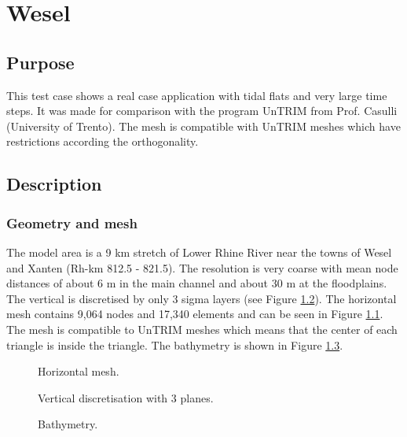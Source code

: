 \chapter{Wesel}

\section{Purpose}
This test case shows a real case application
with tidal flats and very large time steps.
It was made for comparison with the program UnTRIM
from Prof. Casulli (University of Trento).
The mesh is compatible with UnTRIM meshes which have restrictions according the
orthogonality.

\section{Description}

\subsection{Geometry and mesh}
The model area is a 9 km stretch of Lower Rhine River near the towns of Wesel
and Xanten (Rh-km 812.5 - 821.5).
The resolution is very coarse with mean node distances of about 6 m in the main
channel and about 30 m at the floodplains.
The vertical is discretised by only 3 sigma layers
(see Figure \ref{t3d:Wesel:vertical_grid}).
The horizontal mesh contains 9,064 nodes and 17,340 elements and can be seen in
Figure \ref{t3d:Wesel:mesh}.
The mesh is compatible to UnTRIM meshes which means that the center of each
triangle is inside the triangle.
The bathymetry is shown in Figure \ref{t3d:Wesel:Bathy}.

\begin{figure}[h!]
\centering
{}
\caption{Horizontal mesh.}
\label{t3d:Wesel:mesh}
\end{figure}

\begin{figure}[h!]
\centering
{}
\caption{Vertical discretisation with 3 planes.}
\label{t3d:Wesel:vertical_grid}
\end{figure}

\begin{figure} [h!]
\centering
{}
\caption{Bathymetry.}
\label{t3d:Wesel:Bathy}
\end{figure}


